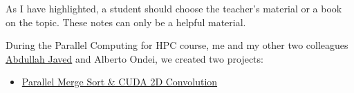 As I have highlighted, a student should choose the teacher's material or a book on the topic. These notes can only be a helpful material.

\highspace
During the Parallel Computing for HPC course, me and my other two colleagues \href{https://it.linkedin.com/in/javedabdullah}{Abdullah Javed} and Alberto Ondei, we created two projects:
\begin{itemize}
    \item[\faIcon{github}] \href{https://github.com/PoliMI-HPC-E-notes-projects-AndreVale69/Parallel-Computing-Challenges}{Parallel Merge Sort \& CUDA 2D Convolution}
    \begin{center}
    \end{center}
\end{itemize}